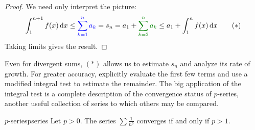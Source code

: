 \begin{proof}
	We need only interpret the picture:
	\[\int_1^{n+1}f(x)\,\dx\le\textcolor{blue}{\sum_{k=1}^n a_k} =s_n= a_1+\textcolor{Green}{\sum_{k=2}^na_k}\le a_1+\int_1^nf(x)\,\dx \tag*{($\ast$)}\]
	Taking limits gives the result.
\end{proof}


Even for divergent sums, $(\ast)$ allows us to estimate $s_n$ and analyze its rate of growth. For greater accuracy, explicitly evaluate the first few terms and use a modified integral test to estimate the remainder.\smallbreak
The big application of the integral test is a complete description of the convergence status of $p$-series, another useful collection of series to which others may be compared.

\begin{cor}{$p$-series}{pseries}
 	Let $p>0$. The series $\sum\frac 1{n^p}$ converges if and only if $p>1$.
\end{cor}

\goodbreak


